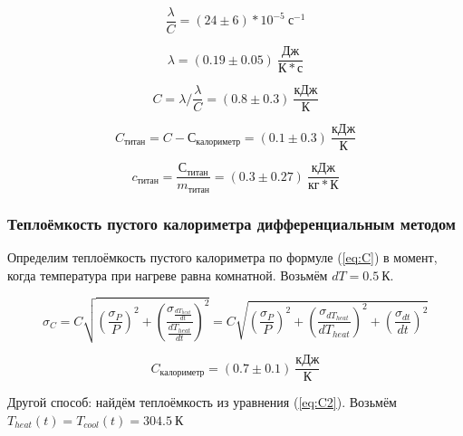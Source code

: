 \documentclass[a4paper, 12pt]{article}
\begin{document}
                \begin{equation*}
                    \frac{\lambda}{C} = (24 \pm 6)*10^{-5}~с^{-1}
                \end{equation*}

                \begin{equation*}
                    \lambda = (0.19 \pm 0.05)~\frac{Дж}{К*с}
                \end{equation*}

                \begin{equation*}
                    C = \lambda / \frac{\lambda}{C} = (0.8 \pm 0.3)~\frac{кДж}{К}
                \end{equation*}

                \begin{equation*}
                    C_{титан} = C - С_{калориметр} = (0.1 \pm 0.3)~\frac{кДж}{К}
                \end{equation*}

                \begin{equation*}
                    c_{титан} = \frac{С_{титан}}{m_{титан}} = (0.3 \pm 0.27)~\frac{кДж}{кг*К}
                \end{equation*}

            \subsubsection{Теплоёмкость пустого калориметра дифференциальным методом}

                Определим теплоёмкость пустого калориметра по формуле (\ref{eq:C}) в момент, когда температура при нагреве равна комнатной. Возьмём $dT = 0.5~К$.

                \begin{equation*}
                    \sigma_C = C \sqrt{\left( \frac{\sigma_P}{P} \right)^2 + \left( \frac{\sigma_{\frac{dT_{heat}}{dt}}}{\frac{dT_{heat}}{dt}} \right)^2} = C \sqrt{\left( \frac{\sigma_P}{P} \right)^2 + \left( \frac{\sigma_{dT_{heat}}}{dT_{heat}} \right)^2 + \left( \frac{\sigma_{dt}}{dt} \right)^2}
                \end{equation*}

                \begin{equation*}
                    C_{калориметр} = (0.7 \pm 0.1)~\frac{кДж}{К}
                \end{equation*}

                Другой способ: найдём теплоёмкость из уравнения (\ref{eq:C2}). Возьмём $T_{heat}(t) = T_{cool}(t) = 304.5~К$
\end{document}
